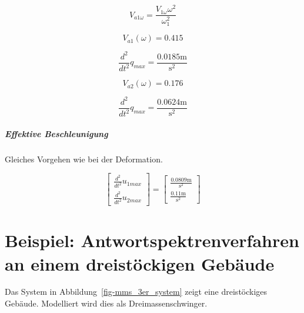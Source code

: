\documentclass[
  letterpaper,
  DIV=11]{scrreprt}
\let\oldparagraph\paragraph
\renewcommand{\paragraph}[1]{\oldparagraph{#1}\mbox{}}
\begin{document}
\begin{equation}V_{a1 \omega} = \frac{V_{1 \omega} \omega^{2}}{\omega_{1}^{2}}\end{equation}

\begin{equation}V_{a1}{\left(\omega \right)} = 0.415\end{equation}

\begin{equation}\frac{d^{2}}{d t^{2}} q_{max} = \frac{0.0185 \text{m}}{\text{s}^{2}}\end{equation}

\begin{equation}V_{a2}{\left(\omega \right)} = 0.176\end{equation}

\begin{equation}\frac{d^{2}}{d t^{2}} q_{max} = \frac{0.0624 \text{m}}{\text{s}^{2}}\end{equation}

\hypertarget{effektive-beschleunigung}{%
\paragraph{Effektive Beschleunigung}\label{effektive-beschleunigung}}

Gleiches Vorgehen wie bei der Deformation.

\begin{equation}\left[\begin{matrix}\frac{d^{2}}{d t^{2}} u_{1max}\\\frac{d^{2}}{d t^{2}} u_{2max}\end{matrix}\right] = \left[\begin{matrix}\frac{0.0809 \text{m}}{\text{s}^{2}}\\\frac{0.11 \text{m}}{\text{s}^{2}}\end{matrix}\right]\end{equation}

\hypertarget{beispiel-antwortspektrenverfahren-an-einem-dreistuxf6ckigen-gebuxe4ude}{%
\chapter{Beispiel: Antwortspektrenverfahren an einem dreistöckigen
Gebäude}\label{beispiel-antwortspektrenverfahren-an-einem-dreistuxf6ckigen-gebuxe4ude}}

Das System in Abbildung~\ref{fig-mms_3er_system} zeigt eine
dreistöckiges Gebäude. Modelliert wird dies als Dreimassenschwinger.
\end{document}
